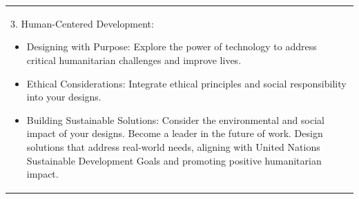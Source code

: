 \documentclass[
	openany, %
	parskip=full, %
	12pt, %
	a4paper, %
]{conferencebooklet} %
\begin{document}
\begin{table}[h!]
{\begin{tabular}{p{120mm}}
            3. Human-Centered Development:
            \begin{itemize}
                \item Designing with Purpose: Explore the power of technology to address critical humanitarian challenges and improve lives.
                \item Ethical Considerations: Integrate ethical principles and social responsibility into your designs.
                \item Building Sustainable Solutions: Consider the environmental and social impact of your designs.  Become a leader in the future of work. Design solutions that address real-world needs, aligning with United Nations Sustainable Development Goals and promoting positive humanitarian impact.
            \end{itemize}
        \end{tabular}
    }
\end{table}

\end{document}

